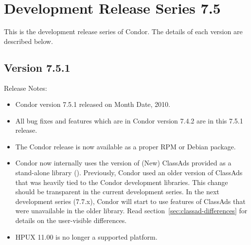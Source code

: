 
\section{\label{sec:History-7-5}Development Release Series 7.5}

This is the development release series of Condor.
The details of each version are described below.

\subsection*{\label{sec:New-7-5-1}Version 7.5.1}

\noindent Release Notes:

\begin{itemize}

\item Condor version 7.5.1 released on Month Date, 2010.

\item All bug fixes and features which are in Condor version 7.4.2
are in this 7.5.1 release.

\item The Condor release is now available as a proper RPM or Debian
package.

\item Condor now internally uses the version of (New) ClassAds provided
as a stand-alone library ().
Previously, Condor 
used an older version of ClassAds that was heavily tied to the Condor 
development libraries. This change should be transparent in the 
current development series. In the next development series (7.7.x),
Condor  will start to use features of ClassAds that were unavailable in the 
older library. 
Read section~\ref{sec:classad-differences} for details on the user-visible
differences.

\item HPUX 11.00 is no longer a supported platform.

\end{itemize}



